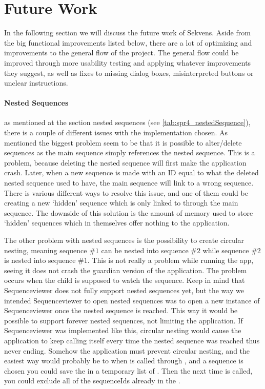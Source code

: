 \section{Future Work}\label{sec:future_work}

In the following section we will discuss the future work of Sekvens. Aside from the big functional improvements listed below, there are a lot of optimizing and improvements to the general flow of the project. The general flow could be improved through more usability testing and applying whatever improvements they suggest, as well as fixes to missing dialog boxes, misinterpreted buttons or unclear instructions.

\paragraph{Nested Sequences} as mentioned at the section nested sequences (see \ref{tab:spr4_nestedSequence}), there is a couple of different issues with the implementation chosen. As mentioned the biggest problem seem to be that it is possible to alter/delete sequences as the main sequence simply references the nested sequence. This is a problem, because deleting the nested sequence will first make the application crash. Later, when a new sequence is made with an ID equal to what the deleted nested sequence used to have, the main sequence will link to a wrong sequence. There is various different ways to resolve this issue, and one of them could be creating a new `hidden' sequence which is only linked to through the main sequence. The downside of this solution is the amount of memory used to store `hidden' sequences which in themselves offer nothing to the application.

The other problem with nested sequences is the possibility to create circular nesting, meaning sequence $\#1$ can be nested into sequence $\#2$ while sequence $\#2$ is nested into sequence $\#1$. This is not really a problem while running the app, seeing it does not crash the guardian version of the application. The problem occurs when the child is supposed to watch the sequence. Keep in mind that Sequenceviewer does not fully support nested sequences yet, but the way we intended Sequenceviewer to open nested sequences was to open a new instance of Sequenceviewer once the nested sequence is reached. This way it would be possible to support forever nested sequences, not limiting the application. If Sequenceviewer was implemented like this, circular nesting would cause the application to keep calling itself every time the nested sequence was reached thus never ending. Somehow the application must prevent circular nesting, and the easiest way would probably be to when  is called through , and a sequence is chosen you could save the  in a temporary list of . Then the next time  is called, you could exclude all of the sequenceIds already in the .

